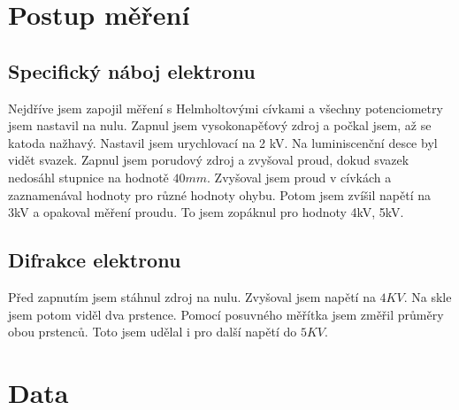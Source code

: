 \documentclass{article}
\begin{document}
\section{Postup měření}
\subsection{Specifický náboj elektronu}
Nejdříve jsem zapojil měření s Helmholtovými cívkami a všechny potenciometry jsem nastavil na nulu.
Zapnul jsem vysokonapěťový zdroj a počkal jsem, až se katoda nažhavý.
Nastavil jsem urychlovací na 2 kV. Na luminiscenční desce byl vidět svazek.
Zapnul jsem porudový zdroj a zvyšoval proud, dokud svazek nedosáhl stupnice na hodnotě $40 mm$.
Zvyšoval jsem proud v cívkách a zaznamenával hodnoty pro různé hodnoty ohybu.
Potom jsem zvíšil napětí na 3kV a opakoval měření proudu.
To jsem zopáknul pro hodnoty 4kV, 5kV.
\subsection{Difrakce elektronu}
Před zapnutím jsem stáhnul zdroj na nulu. Zvyšoval jsem napětí na $4KV$. Na skle jsem potom viděl
dva prstence. Pomocí posuvného měřítka jsem změřil průměry obou prstenců. Toto jsem udělal i pro další napětí do $5KV$.
\section{Data}
\end{document}
